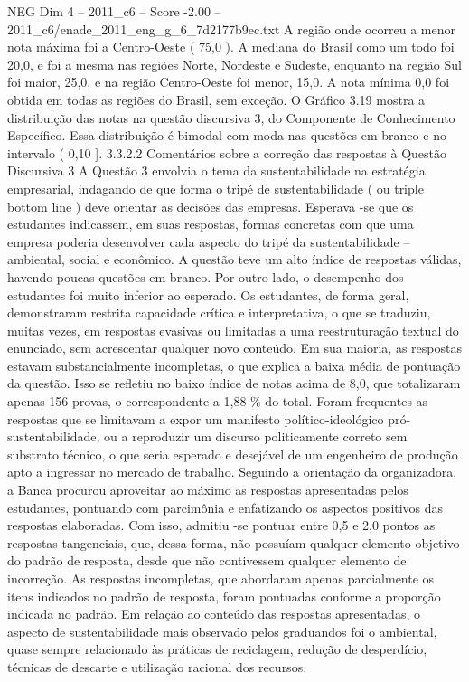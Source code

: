 \begin{textsample}{NEG Dim 4 – 2011\_c6 – Score -2.00 – 2011\_c6/enade\_2011\_eng\_g\_6\_7d2177b9ec.txt}
A região onde ocorreu a menor nota máxima foi a Centro-Oeste ( 75,0 ).
A mediana do Brasil como um todo foi 20,0, e foi a mesma nas regiões Norte, Nordeste e Sudeste, enquanto na região Sul foi maior, 25,0, e na região Centro-Oeste foi menor, 15,0.
A nota mínima 0,0 foi obtida em todas as regiões do Brasil, sem exceção.
O Gráfico 3.19 mostra a distribuição das notas na questão discursiva 3, do Componente de Conhecimento Específico.
Essa distribuição é bimodal com moda nas questões em branco e no intervalo ( 0,10 ]. 3.3.2.2 Comentários sobre a correção das respostas à Questão Discursiva 3 A Questão 3 envolvia o tema da sustentabilidade na estratégia empresarial, indagando de que forma o tripé de sustentabilidade ( ou triple bottom line ) deve orientar as decisões das empresas.
Esperava -se que os estudantes indicassem, em suas respostas, formas concretas com que uma empresa poderia desenvolver cada aspecto do tripé da sustentabilidade – ambiental, social e econômico.
A questão teve um alto índice de respostas válidas, havendo poucas questões em branco.
Por outro lado, o desempenho dos estudantes foi muito inferior ao esperado.
Os estudantes, de forma geral, demonstraram restrita capacidade crítica e interpretativa, o que se traduziu, muitas vezes, em respostas evasivas ou limitadas a uma reestruturação textual do enunciado, sem acrescentar qualquer novo conteúdo.
Em sua maioria, as respostas estavam substancialmente incompletas, o que explica a baixa média de pontuação da questão.
Isso se refletiu no baixo índice de notas acima de 8,0, que totalizaram apenas 156 provas, o correspondente a 1,88 \% do total.
Foram frequentes as respostas que se limitavam a expor um manifesto político-ideológico pró-sustentabilidade, ou a reproduzir um discurso politicamente correto sem substrato técnico, o que seria esperado e desejável de um engenheiro de produção apto a ingressar no mercado de trabalho.
Seguindo a orientação da organizadora, a Banca procurou aproveitar ao máximo as respostas apresentadas pelos estudantes, pontuando com parcimônia e enfatizando os aspectos positivos das respostas elaboradas.
Com isso, admitiu -se pontuar entre 0,5 e 2,0 pontos as respostas tangenciais, que, dessa forma, não possuíam qualquer elemento objetivo do padrão de resposta, desde que não contivessem qualquer elemento de incorreção.
As respostas incompletas, que abordaram apenas parcialmente os itens indicados no padrão de resposta, foram pontuadas conforme a proporção indicada no padrão.
Em relação ao conteúdo das respostas apresentadas, o aspecto de sustentabilidade mais observado pelos graduandos foi o ambiental, quase sempre relacionado às práticas de reciclagem, redução de desperdício, técnicas de descarte e utilização racional dos recursos.

\end{textsample}
